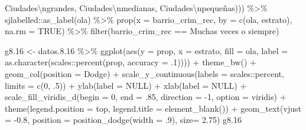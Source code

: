 \documentclass[
  12pt,
]{book}
\newenvironment{Shaded}{\begin{snugshade}}{\end{snugshade}}
\newcommand{\AttributeTok}[1]{\textcolor[rgb]{0.77,0.63,0.00}{#1}}
\newcommand{\ConstantTok}[1]{\textcolor[rgb]{0.00,0.00,0.00}{#1}}
\newcommand{\DecValTok}[1]{\textcolor[rgb]{0.00,0.00,0.81}{#1}}
\newcommand{\FloatTok}[1]{\textcolor[rgb]{0.00,0.00,0.81}{#1}}
\newcommand{\FunctionTok}[1]{\textcolor[rgb]{0.00,0.00,0.00}{#1}}
\newcommand{\NormalTok}[1]{#1}
\newcommand{\OtherTok}[1]{\textcolor[rgb]{0.56,0.35,0.01}{#1}}
\newcommand{\SpecialCharTok}[1]{\textcolor[rgb]{0.00,0.00,0.00}{#1}}
\newcommand{\StringTok}[1]{\textcolor[rgb]{0.31,0.60,0.02}{#1}}
\begin{document}
\begin{Shaded}
\begin{Highlighting}[]
                                     \StringTok{\textquotesingle{}Ciudades}\SpecialCharTok{\textbackslash{}n}\StringTok{grandes\textquotesingle{}}\NormalTok{, }\StringTok{\textquotesingle{}Ciudades}\SpecialCharTok{\textbackslash{}n}\StringTok{medianas\textquotesingle{}}\NormalTok{, }\StringTok{\textquotesingle{}Ciudades}\SpecialCharTok{\textbackslash{}n}\StringTok{pequeñas\textquotesingle{}}\NormalTok{))) }\SpecialCharTok{\%\textgreater{}\%}
\NormalTok{  sjlabelled}\SpecialCharTok{::}\FunctionTok{as\_label}\NormalTok{(ola) }\SpecialCharTok{\%\textgreater{}\%} 
  \FunctionTok{prop}\NormalTok{(}\AttributeTok{x =}\NormalTok{ barrio\_crim\_rec, }\AttributeTok{by =} \FunctionTok{c}\NormalTok{(ola, estrato), }\AttributeTok{na.rm =} \ConstantTok{TRUE}\NormalTok{) }\SpecialCharTok{\%\textgreater{}\%} 
  \FunctionTok{filter}\NormalTok{(barrio\_crim\_rec }\SpecialCharTok{==} \StringTok{\textquotesingle{}Muchas veces o siempre\textquotesingle{}}\NormalTok{)}

\NormalTok{g8}\FloatTok{.16} \OtherTok{\textless{}{-}}\NormalTok{ datos.}\FloatTok{8.16} \SpecialCharTok{\%\textgreater{}\%} 
  \FunctionTok{ggplot}\NormalTok{(}\FunctionTok{aes}\NormalTok{(}\AttributeTok{y =}\NormalTok{ prop, }\AttributeTok{x =}\NormalTok{ estrato, }\AttributeTok{fill =}\NormalTok{ ola, }
             \AttributeTok{label =} \FunctionTok{as.character}\NormalTok{(scales}\SpecialCharTok{::}\FunctionTok{percent}\NormalTok{(prop, }\AttributeTok{accuracy =}\NormalTok{ .}\DecValTok{1}\NormalTok{)))) }\SpecialCharTok{+} 
  \FunctionTok{theme\_bw}\NormalTok{() }\SpecialCharTok{+} 
  \FunctionTok{geom\_col}\NormalTok{(}\AttributeTok{position =} \StringTok{\textquotesingle{}Dodge\textquotesingle{}}\NormalTok{) }\SpecialCharTok{+}
  \FunctionTok{scale\_y\_continuous}\NormalTok{(}\AttributeTok{labels =}\NormalTok{ scales}\SpecialCharTok{::}\NormalTok{percent,}
                     \AttributeTok{limits =} \FunctionTok{c}\NormalTok{(}\DecValTok{0}\NormalTok{, .}\DecValTok{5}\NormalTok{)) }\SpecialCharTok{+}
  \FunctionTok{ylab}\NormalTok{(}\AttributeTok{label =} \ConstantTok{NULL}\NormalTok{) }\SpecialCharTok{+}
  \FunctionTok{xlab}\NormalTok{(}\AttributeTok{label =} \ConstantTok{NULL}\NormalTok{) }\SpecialCharTok{+}
  \FunctionTok{scale\_fill\_viridis\_d}\NormalTok{(}\AttributeTok{begin =} \DecValTok{0}\NormalTok{, }\AttributeTok{end =}\NormalTok{ .}\DecValTok{85}\NormalTok{, }\AttributeTok{direction =} \SpecialCharTok{{-}}\DecValTok{1}\NormalTok{, }\AttributeTok{option =} \StringTok{\textquotesingle{}viridis\textquotesingle{}}\NormalTok{) }\SpecialCharTok{+}
  \FunctionTok{theme}\NormalTok{(}\AttributeTok{legend.position =} \StringTok{\textquotesingle{}top\textquotesingle{}}\NormalTok{,}
        \AttributeTok{legend.title =} \FunctionTok{element\_blank}\NormalTok{()) }\SpecialCharTok{+}
  \FunctionTok{geom\_text}\NormalTok{(}\AttributeTok{vjust =} \SpecialCharTok{{-}}\FloatTok{0.8}\NormalTok{,}
            \AttributeTok{position =} \FunctionTok{position\_dodge}\NormalTok{(}\AttributeTok{width =}\NormalTok{ .}\DecValTok{9}\NormalTok{),}
            \AttributeTok{size=} \FloatTok{2.75}\NormalTok{)}
\NormalTok{g8}\FloatTok{.16}
\end{Highlighting}
\end{Shaded}
\end{document}
